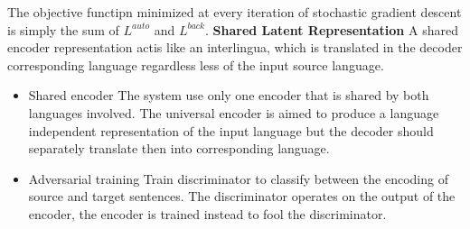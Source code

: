 The objective functipn minimized at every iteration of stochastic gradient descent is simply the sum of $L^{auto}$ and $L^{back}$. 
\textbf{Shared Latent Representation} 
A shared encoder representation actis like an interlingua, which is translated in the decoder corresponding language regardless less of the input source language.  
\begin{itemize}
	\item Shared encoder
	The system use only one encoder that is shared by both languages involved. The universal encoder is aimed to produce a language independent representation of the input language but the decoder should separately translate then into corresponding language.
	\item Adversarial training
	Train discriminator to classify between the encoding of source and target sentences. The discriminator operates on the output of the encoder, the encoder is trained instead to fool the discriminator. 
\end{itemize}








